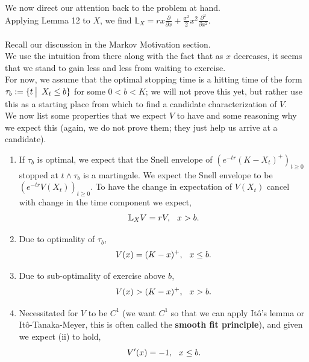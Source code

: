 \documentclass[12pt]{article}
\newcommand{\bL}{\mathbb{L}}
\newcommand{\quantifyspace}{\hspace{2px} \big | \hspace{5px}}
\newcommand{\spc}{\hspace{7 px}}
\theoremstyle{definition}
\begin{document}
We now direct our attention back to the problem at hand. \\
Applying Lemma 12 to $X$, we find $\bL_X = rx \frac{\partial}{\partial x} + \frac{\sigma^2}{2} x^2 \frac{\partial^2}{\partial x^2}$. \\
\\
Recall our discussion in the Markov Motivation section. \\
We use the intuition from there along with the fact that as $x$ decreases, it seems that we stand to gain less and less from waiting to exercise. \\
For now, we assume that the optimal stopping time is a hitting time of the form $\tau_b := \{t \quantifyspace X_t \leq b\}$ for some $0 < b < K$; we will not prove this yet, but rather use this as a starting place from which to find a candidate characterization of $V$. \\
We now list some properties that we expect $V$ to have and some reasoning why we expect this (again, we do not prove them; they just help us arrive at a candidate). \\
\begin{enumerate}
    \item[(i)]
If $\tau_b$ is optimal, we expect that the Snell envelope of $(e^{-tr} (K - X_{t})^+)_{t \geq 0}$ stopped at $t \wedge \tau_b$ is a martingale.
We expect the Snell envelope to be $(e^{-tr} V(X_t))_{t \geq 0}$. To have the change in expectation of $V(X_t)$ cancel with change in the time component we expect,
\[
    \bL_X V = r V, \spc  x > b.
\]
    \item [(ii)]
Due to optimality of $\tau_b$,
\[
    V(x) = (K - x)^+, \spc x \leq b.
\]
    \item[(iii)]
Due to sub-optimality of exercise above $b$,
\[
    V(x) > (K - x)^+, \spc x > b.
\]
    \item[(iv)]
Necessitated for $V$ to be $C^1$ (we want $C^1$ so that we can apply Itô's lemma or Itô-Tanaka-Meyer, this is often called the \textbf{smooth fit principle}), and given we expect (ii) to hold,
\[
    V'(x) = -1, \spc x \leq b.
\]
\end{enumerate}
\end{document}
